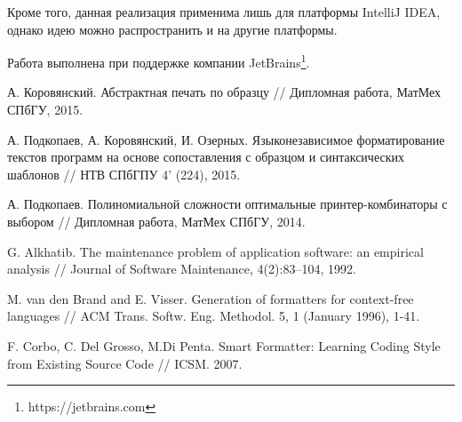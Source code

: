 \documentclass[conference]{IEEEtran}
\begin{document}
Кроме того, данная реализация применима лишь для платформы IntelliJ IDEA, однако идею можно распространить и на другие платформы.

Работа выполнена при поддержке компании JetBrains\footnote{https://jetbrains.com}.

\nocite{*}


\begin{thebibliography}{4}

  А. Коровянский. Абстрактная печать по образцу
  // Дипломная работа, МатМех СПбГУ, 2015.

  А. Подкопаев, А. Коровянский, И. Озерных.
  Языконезависимое форматирование текстов программ
  на основе сопоставления с образцом и синтаксических шаблонов
  // НТВ СПбГПУ 4' (224), 2015.

  А. Подкопаев. Полиномиальной сложности оптимальные принтер-комбинаторы с выбором
  // Дипломная работа, МатМех СПбГУ, 2014.
  
  G. Alkhatib.
  The maintenance problem of application software:
an empirical analysis //
  Journal of Software Maintenance, 4(2):83–104, 1992.
  
 M. van den Brand and E. Visser.
Generation of formatters for context-free languages //
ACM Trans. Softw. Eng. Methodol. 5, 1 (January 1996), 1-41.

 F. Corbo, C. Del Grosso, M.Di Penta.
Smart Formatter: Learning Coding Style from Existing Source Code //
ICSM. 2007.

\end{thebibliography}
\end{document}
